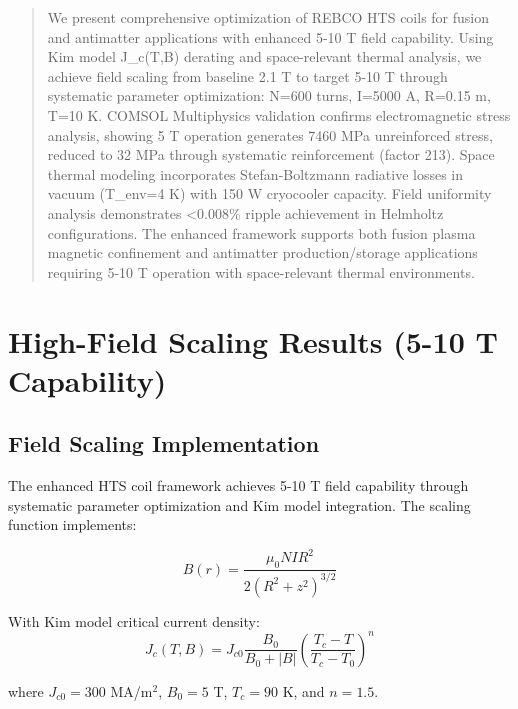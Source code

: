 
\begin{abstract}
We present comprehensive optimization of REBCO HTS coils for fusion and antimatter applications with enhanced 5-10 T field capability. Using Kim model J_c(T,B) derating and space-relevant thermal analysis, we achieve field scaling from baseline 2.1 T to target 5-10 T through systematic parameter optimization: N=600 turns, I=5000 A, R=0.15 m, T=10 K. COMSOL Multiphysics validation confirms electromagnetic stress analysis, showing 5 T operation generates 7460 MPa unreinforced stress, reduced to 32 MPa through systematic reinforcement (factor 213). Space thermal modeling incorporates Stefan-Boltzmann radiative losses in vacuum (T_env=4 K) with 150 W cryocooler capacity. Field uniformity analysis demonstrates <0.008\% ripple achievement in Helmholtz configurations. The enhanced framework supports both fusion plasma magnetic confinement and antimatter production/storage applications requiring 5-10 T operation with space-relevant thermal environments.
\end{abstract}

\section{High-Field Scaling Results (5-10 T Capability)}

\subsection{Field Scaling Implementation}

The enhanced HTS coil framework achieves 5-10 T field capability through systematic parameter optimization and Kim model integration. The scaling function implements:

\begin{equation}
B(r) = \frac{\mu_0 N I R^2}{2(R^2 + z^2)^{3/2}}
\end{equation}

With Kim model critical current density:
\begin{equation}
J_c(T,B) = J_{c0} \frac{B_0}{B_0 + |B|} \left(\frac{T_c - T}{T_c - T_0}\right)^n
\end{equation}

where $J_{c0} = 300$ MA/m$^2$, $B_0 = 5$ T, $T_c = 90$ K, and $n = 1.5$.

